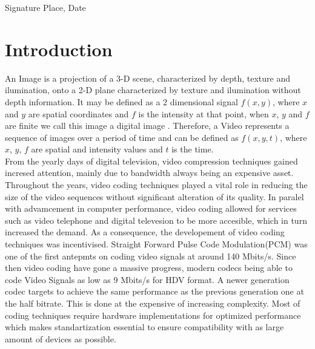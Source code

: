 \documentclass[a4paper,11pt,oneside]{article}
\begin{document}
  \vspace{20mm}

  Signature \hfill Place, Date

  \newpage
  \begin{abstract}
 
  
  \end{abstract}

  
  \clearpage

  \fi

  \newpage
  \tableofcontents

  \newpage
  \listoffigures

  \newpage

  \section{Introduction}
  \indent 
  An Image is a projection of a 3-D scene, characterized by depth, texture and ilumination, onto a 2-D plane characterized by texture and ilumination 
  without depth information\cite[p.~5]{richardson2002video}. It may be defined as a 2 dimensional signal $ f(x, y) $, where $x$ and $y$ are spatial 
  coordinates and $f$ is the intensity at that point, when $x$, $y$ and $f$ are finite we call this image a digital image \cite[p.~1]{gonzalez2008digital}. 
  Therefore, a Video represents a sequence of images over a period of time and can be defined as $f(x,y,t)$, where $x$, $y$, $f$ are spatial and intensity values 
  and $t$ is the time.\\



  \indent From the yearly days of digital television, video compression techniques gained incresed attention, mainly due to bandwidth always being 
  an expensive asset. Throughout the years, video coding techniques played a vital role in reducing the size of the video sequences without significant
  alteration of its quality. In paralel with advamcement in computer performance, video coding allowed for services such as video telephone and digital 
  televesion to be more accesible, which in turn increased the demand. As a consequence, the developement of video coding techniques was incentivised. 
  Straight Forward Pulse Code Modulation(PCM) was one of the first antepmts on coding video signals at around 140 Mbits/s. Since then video coding 
  have gone a massive progress, modern codecs being able to code Video Signals as low as 9 Mbits/s for HDV format. A newer generation codec targets 
  to achieve the same performance as the previous generation one at the half bitrate. This is done at the expensive of increasing complexity. Most of coding
  techniques require hardware implementations for optimized performance which makes standartization essential to ensure compatibility with as large amount of devices 
  as possible.\cite{ghanbari2011standard}
  \newpage
\end{document}
